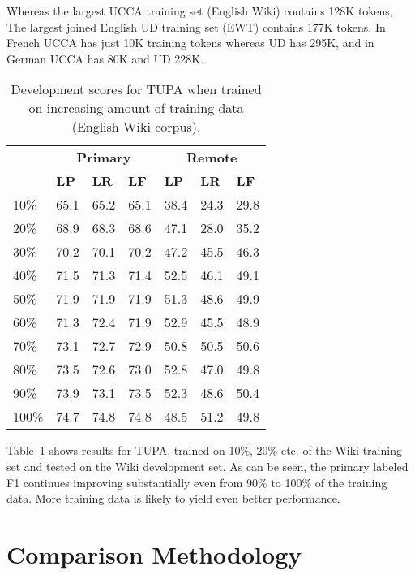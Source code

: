 \documentclass[11pt,a4paper]{article}
\begin{document}
Whereas the largest UCCA training set (English Wiki) contains 128K tokens,
The largest joined English UD training set (EWT) contains 177K tokens.
In French UCCA has just 10K training tokens whereas UD has 295K,
and in German UCCA has 80K and UD 228K.

\begin{table}[t]
\centering
\begin{tabular}{l|lll|lll}
& \multicolumn{3}{c|}{\footnotesize \bf Primary} & \multicolumn{3}{c}{\footnotesize \bf Remote} \\
& \footnotesize \textbf{LP} & \footnotesize \textbf{LR} & \footnotesize \textbf{LF}
& \footnotesize \textbf{LP} & \footnotesize \textbf{LR} & \footnotesize \textbf{LF} \\
\hline
\footnotesize 10\% & 65.1 & 65.2 & 65.1 & 38.4 & 24.3 & 29.8\\
\footnotesize 20\% & 68.9 & 68.3 & 68.6 & 47.1 & 28.0 & 35.2\\
\footnotesize 30\% & 70.2 & 70.1 & 70.2 & 47.2 & 45.5 & 46.3\\
\footnotesize 40\% & 71.5 & 71.3 & 71.4 & 52.5 & 46.1 & 49.1\\
\footnotesize 50\% & 71.9 & 71.9 & 71.9 & 51.3 & 48.6 & 49.9\\
\footnotesize 60\% & 71.3 & 72.4 & 71.9 & 52.9 & 45.5 & 48.9\\
\footnotesize 70\% & 73.1 & 72.7 & 72.9 & 50.8 & 50.5 & 50.6\\
\footnotesize 80\% & 73.5 & 72.6 & 73.0 & 52.8 & 47.0 & 49.8\\
\footnotesize 90\% & 73.9 & 73.1 & 73.5 & 52.3 & 48.6 & 50.4\\
\footnotesize 100\% & 74.7 & 74.8 & 74.8 & 48.5 & 51.2 & 49.8\\
\end{tabular}
\caption{
Development scores for TUPA \protect\cite{hershcovich2017a} when trained on increasing amount of training data
(English Wiki corpus).
\label{tab:partial_data_results}}
\end{table}

Table~\ref{tab:partial_data_results} shows results for TUPA,
trained on 10\%, 20\% etc. of the Wiki training set and tested on the Wiki development set.
As can be seen, the primary labeled F1 continues improving substantially even from 90\% to 100\%
of the training data. More training data is likely to yield even better performance.

\section{Comparison Methodology}\label{sec:conversion}
\end{document}
